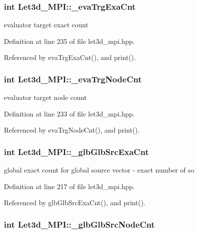 \subsubsection{\setlength{\rightskip}{0pt plus 5cm}int {\bf Let3d\_\-MPI::\_\-eva\-Trg\-Exa\-Cnt}\hspace{0.3cm}{\tt  [protected]}}\label{classLet3d__MPI_8c8eac412088c538672ef537abceb07f_8c8eac412088c538672ef537abceb07f}


evaluator target exact count 

Definition at line 235 of file let3d\_\-mpi.hpp.

Referenced by eva\-Trg\-Exa\-Cnt(), and print().
\subsubsection{\setlength{\rightskip}{0pt plus 5cm}int {\bf Let3d\_\-MPI::\_\-eva\-Trg\-Node\-Cnt}\hspace{0.3cm}{\tt  [protected]}}\label{classLet3d__MPI_cfe8916ba5077d66cc094aee89793deb_cfe8916ba5077d66cc094aee89793deb}


evaluator target node count 

Definition at line 233 of file let3d\_\-mpi.hpp.

Referenced by eva\-Trg\-Node\-Cnt(), and print().
\subsubsection{\setlength{\rightskip}{0pt plus 5cm}int {\bf Let3d\_\-MPI::\_\-glb\-Glb\-Src\-Exa\-Cnt}\hspace{0.3cm}{\tt  [protected]}}\label{classLet3d__MPI_6ae6ded47d6df05876c963736dff3819_6ae6ded47d6df05876c963736dff3819}


global exact count for global source vector - exact number of so 

Definition at line 217 of file let3d\_\-mpi.hpp.

Referenced by glb\-Glb\-Src\-Exa\-Cnt(), and print().
\subsubsection{\setlength{\rightskip}{0pt plus 5cm}int {\bf Let3d\_\-MPI::\_\-glb\-Glb\-Src\-Node\-Cnt}\hspace{0.3cm}{\tt  [protected]}}\label{classLet3d__MPI_e9838b876d7c07a22a878b26757b9d6d_e9838b876d7c07a22a878b26757b9d6d}


